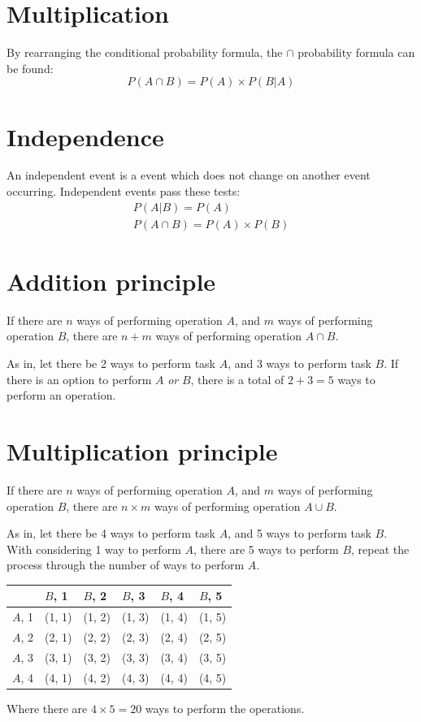 \documentclass{book}
\begin{document}
\section{Multiplication}
By rearranging the conditional probability formula, the $\cap$ probability formula can be found:
\[
	P(A \cap B) = P(A) \times P(B|A)
\]

\section{Independence}
An independent event is a event which does not change on another event occurring.  Independent events pass these tests:
\begin{align*}
	P(A|B) = P(A) \\
	P(A \cap B) = P(A) \times P(B)
\end{align*}

\section{Addition principle}
If there are $n$ ways of performing operation $A$, and $m$ ways of performing operation $B$, there are $n + m$ ways of performing operation $A \cap B$.

As in, let there be 2 ways to perform task $A$, and 3 ways to perform task $B$.  If there is an option to perform $A$ \emph{or} $B$, there is a total of $2 + 3 = 5$ ways to perform an operation.

\section{Multiplication principle}
If there are $n$ ways of performing operation $A$, and $m$ ways of performing operation $B$, there are $n \times m$ ways of performing operation $A \cup B$.

As in, let there be 4 ways to perform task $A$, and 5 ways to perform task $B$.  With considering 1 way to perform $A$, there are 5 ways to perform $B$, repeat the process through the number of ways to perform $A$.
\begin{center}
	\begin{tabular}{l|lllll}
		       & $B$, 1 & $B$, 2 & $B$, 3 & $B$, 4 & $B$, 5 \\ \hline
		$A$, 1 & (1, 1) & (1, 2) & (1, 3) & (1, 4) & (1, 5) \\
		$A$, 2 & (2, 1) & (2, 2) & (2, 3) & (2, 4) & (2, 5) \\
		$A$, 3 & (3, 1) & (3, 2) & (3, 3) & (3, 4) & (3, 5) \\
		$A$, 4 & (4, 1) & (4, 2) & (4, 3) & (4, 4) & (4, 5) \\
	\end{tabular}
\end{center}
Where there are $4 \times 5 = 20$ ways to perform the operations.
\end{document}
